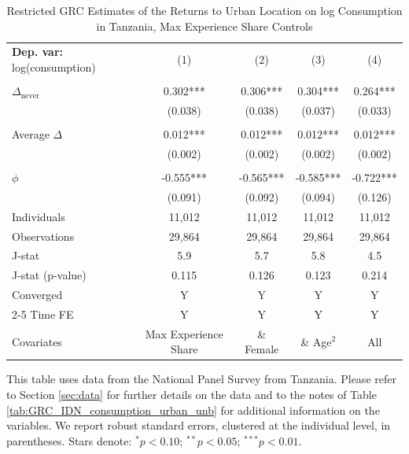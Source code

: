 \begin{table}[htbp] \centering \begin{threeparttable}
 \caption{Restricted GRC Estimates of the Returns to Urban Location on log Consumption in Tanzania, Max Experience Share Controls} 
 \label{tab:GRC_TZA_consumption_urban_unb_exp_m_sh} 
\begin{tabular}{l cccc} \toprule  \textbf{Dep. var:}  log(consumption) 
                    &\multicolumn{1}{c}{(1)}   &\multicolumn{1}{c}{(2)}   &\multicolumn{1}{c}{(3)}   &\multicolumn{1}{c}{(4)}   \\
                    &               &               &               &               \\
\addlinespace
$\Delta_{\text{never}}$&       0.302***&       0.306***&       0.304***&       0.264***\\
                    &     (0.038)   &     (0.038)   &     (0.037)   &     (0.033)   \\
                    &               &               &               &               \\
\addlinespace
Average $\Delta$    &       0.012***&       0.012***&       0.012***&       0.012***\\
                    &     (0.002)   &     (0.002)   &     (0.002)   &     (0.002)   \\
                    &               &               &               &               \\
\addlinespace
$\phi$              &      -0.555***&      -0.565***&      -0.585***&      -0.722***\\
                    &     (0.091)   &     (0.092)   &     (0.094)   &     (0.126)   \\
\addlinespace
Individuals         &      11,012   &      11,012   &      11,012   &      11,012   \\
Observations        &      29,864   &      29,864   &      29,864   &      29,864   \\
J-stat              &         5.9   &         5.7   &         5.8   &         4.5   \\
J-stat (p-value)    &       0.115   &       0.126   &       0.123   &       0.214   \\
Converged           &           Y   &           Y   &           Y   &           Y   \\
\cmidrule{2-5} Time FE & Y & Y & Y & Y \\ Covariates & Max Experience Share & \& Female & \& Age$^2$ & All \\ \bottomrule \end{tabular} \begin{tablenotes}[flushleft] \footnotesize \item{This table uses data from the National Panel Survey from Tanzania. Please refer to Section \ref{sec:data} for further details on the data and to the notes of Table \ref{tab:GRC_IDN_consumption_urban_unb} for additional information on the variables. We report robust standard errors, clustered at the individual level, in parentheses. Stars denote: $^{*} p<0.10$; $^{**} p<0.05$; $^{***} p<0.01$.} \end{tablenotes} \end{threeparttable} \end{table}
